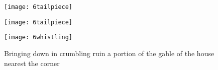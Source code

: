 \begin{a4}
	\begin{figure}[b!]
		\centering
		\texttt{[image: 6tailpiece]}
	\end{figure}
	\clearpage
\end{a4}

\begin{letter}
	\begin{figure}[b!]
		\centering
		\texttt{[image: 6tailpiece]}
	\end{figure}
\end{letter}

\begin{figure}[p]
\centering
\texttt{[image: 6whistling]}
\caption[Bringing down in crumbling ruin the house nearest the corner]{Bringing down in crumbling ruin a portion of the gable of the house nearest the corner}
\end{figure}
